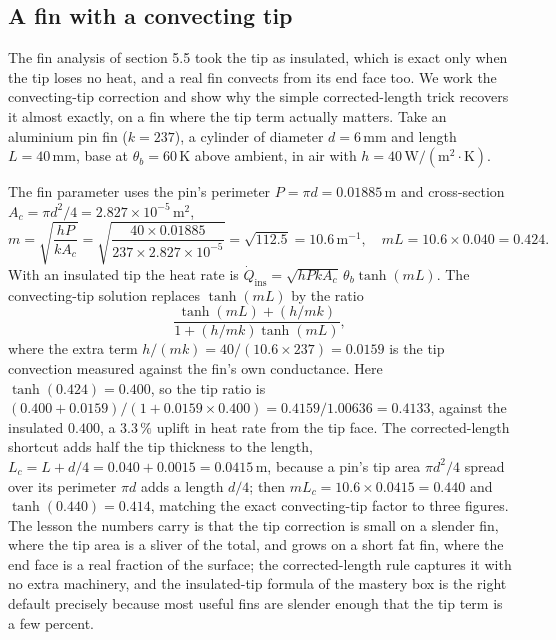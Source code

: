 

\subsection{A fin with a convecting tip}

The fin analysis of section 5.5 took the tip as insulated, which is exact only
when the tip loses no heat, and a real fin convects from its end face too. We
work the convecting-tip correction and show why the simple corrected-length
trick recovers it almost exactly, on a fin where the tip term actually
matters. Take an aluminium pin fin ($k = 237$), a cylinder of diameter
$d = 6\,\si{\milli\meter}$ and length $L = 40\,\si{\milli\meter}$, base at
$\theta_b = 60\,\si{\kelvin}$ above ambient, in air with $h = 40\,\text{W}/
(\text{m}^2\cdot\si{\kelvin})$.

The fin parameter uses the pin's perimeter $P = \pi d = 0.01885\,\text{m}$
and cross-section $A_c = \pi d^2/4 = 2.827\times10^{-5}\,\text{m}^2$,
\[
m = \sqrt{\frac{hP}{kA_c}} = \sqrt{\frac{40\times0.01885}{237\times2.827
\times10^{-5}}} = \sqrt{112.5} = 10.6\,\text{m}^{-1}, \quad mL = 10.6\times
0.040 = 0.424.
\]
With an insulated tip the heat rate is $\dot{Q}_{\text{ins}} = \sqrt{hPkA_c}
\,\theta_b\tanh(mL)$. The convecting-tip solution replaces $\tanh(mL)$ by the
ratio
\[
\frac{\tanh(mL) + (h/mk)}{1 + (h/mk)\tanh(mL)},
\]
where the extra term $h/(mk) = 40/(10.6\times237) = 0.0159$ is the tip
convection measured against the fin's own conductance. Here $\tanh(0.424) =
0.400$, so the tip ratio is $(0.400 + 0.0159)/(1 + 0.0159\times0.400) =
0.4159/1.00636 = 0.4133$, against the insulated $0.400$, a $3.3\,\%$ uplift in
heat rate from the tip face. The corrected-length shortcut adds half the tip
thickness to the length, $L_c = L + d/4 = 0.040 + 0.0015 = 0.0415\,\text{m}$,
because a pin's tip area $\pi d^2/4$ spread over its perimeter $\pi d$ adds a
length $d/4$; then $mL_c = 10.6\times0.0415 = 0.440$ and $\tanh(0.440) =
0.414$, matching the exact convecting-tip factor to three figures. The lesson
the numbers carry is that the tip correction is small on a slender fin, where
the tip area is a sliver of the total, and grows on a short fat fin, where the
end face is a real fraction of the surface; the corrected-length rule captures
it with no extra machinery, and the insulated-tip formula of the mastery box
is the right default precisely because most useful fins are slender enough
that the tip term is a few percent.

